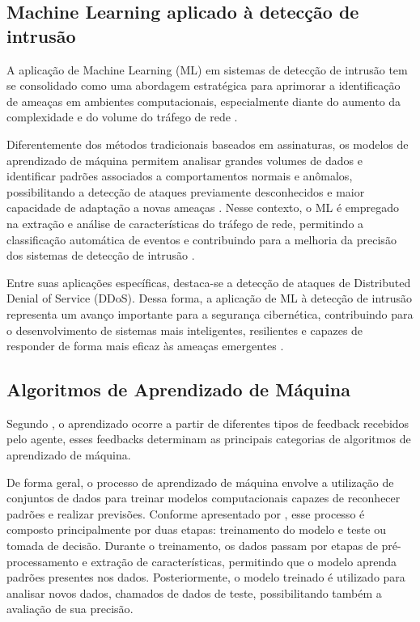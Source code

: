 \documentclass[
    12pt,                %
    openright,           %
    oneside,             %
    a4paper,             %
    english,             %
    brazil               %
]{abntex2}
\begin{document}
\subsection{Machine Learning aplicado à detecção de intrusão}
A aplicação de Machine Learning (ML) em sistemas de detecção de intrusão tem se consolidado como uma abordagem estratégica para aprimorar a identificação de ameaças em ambientes computacionais, especialmente diante do aumento da complexidade e do volume do tráfego de rede \cite{Gopalakrishnan2023}. 


Diferentemente dos métodos tradicionais baseados em assinaturas, os modelos de aprendizado de máquina permitem analisar grandes volumes de dados e identificar padrões associados a comportamentos normais e anômalos, possibilitando a detecção de ataques previamente desconhecidos e maior capacidade de adaptação a novas ameaças \cite{Gopalakrishnan2023}. Nesse contexto, o ML é empregado na extração e análise de características do tráfego de rede, permitindo a classificação automática de eventos e contribuindo para a melhoria da precisão dos sistemas de detecção de intrusão \cite{Gopalakrishnan2023}. 


Entre suas aplicações específicas, destaca-se a detecção de ataques de Distributed Denial of Service (DDoS). Dessa forma, a aplicação de ML à detecção de intrusão representa um avanço importante para a segurança cibernética, contribuindo para o desenvolvimento de sistemas mais inteligentes, resilientes e capazes de responder de forma mais eficaz às ameaças emergentes \cite{Gopalakrishnan2023,Aktar2023}. 

\subsection{Algoritmos de Aprendizado de Máquina}
Segundo , o aprendizado ocorre a partir de diferentes tipos de feedback recebidos pelo agente, esses feedbacks determinam as principais categorias de algoritmos de aprendizado de máquina.


De forma geral, o processo de aprendizado de máquina envolve a utilização de conjuntos de dados para treinar modelos computacionais capazes de reconhecer padrões e realizar previsões. Conforme apresentado por , esse processo é composto principalmente por duas etapas: treinamento do modelo e teste ou tomada de decisão. Durante o treinamento, os dados passam por etapas de pré-processamento e extração de características, permitindo que o modelo aprenda padrões presentes nos dados. Posteriormente, o modelo treinado é utilizado para analisar novos dados, chamados de dados de teste, possibilitando também a avaliação de sua precisão\cite{Gopalakrishnan2023}.
\end{document}
